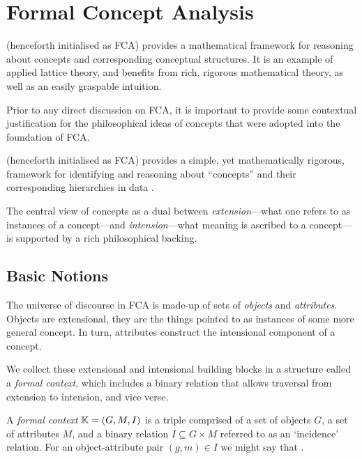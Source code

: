 \chapter{Formal Concept Analysis}
\label{chapter:formal-concept-analysis}

\FCA (henceforth initialised as FCA) provides a mathematical framework for reasoning about concepts and corresponding conceptual structures. It is an example of applied lattice theory, and benefits from rich, rigorous mathematical theory, as well as an easily graspable intuition. 

Prior to any direct discussion on FCA, it is important to provide some contextual justification for the philosophical ideas of concepts that were adopted into the foundation of FCA. 

\FCA (henceforth initialised as FCA) provides a simple, yet mathematically rigorous, framework for identifying and reasoning about ``concepts'' and their corresponding hierarchies in data \cite{ganter1999formal,ganter2016conceptual}. 

The central view of concepts as a dual between \textit{extension}---what one refers to as instances of a concept---and \textit{intension}---what meaning is ascribed to a concept---is supported by a rich philosophical backing.   

\section{Basic Notions}
\label{section:basic-notions}
The universe of discourse in FCA is made-up of sets of \textit{objects} and \textit{attributes}. Objects are extensional, they are the things pointed to as instances of some more general concept. In turn, attributes construct the intensional component of a concept.

We collect these extensional and intensional building blocks in a structure called a \textit{formal context}, which includes a binary relation that allows traversal from extension to intension, and vice verse.

\begin{definition}
  \label{definition:formal-context}
  A \textit{formal context} $\mathbb{K} = (G,M,I)$ is a triple comprised of a set of objects $G$, a set of attributes $M$, and a binary relation $I \subseteq G \times M$ referred to as an `incidence' relation. For an object-attribute pair $(g,m) \in I$ we might say that .
\end{definition}


